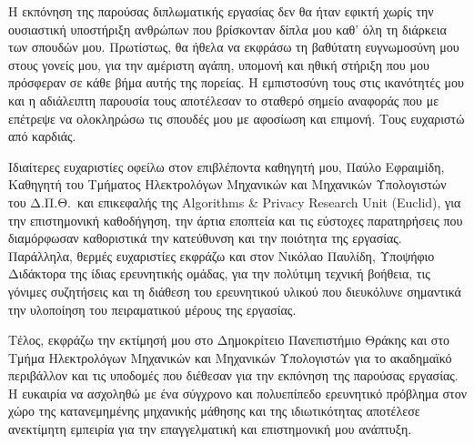 
Η εκπόνηση της παρούσας διπλωματικής εργασίας δεν θα ήταν εφικτή χωρίς την ουσιαστική υποστήριξη ανθρώπων που βρίσκονταν δίπλα μου καθ' όλη τη διάρκεια των σπουδών μου. Πρωτίστως, θα ήθελα να εκφράσω τη βαθύτατη ευγνωμοσύνη μου στους γονείς μου, για την αμέριστη αγάπη, υπομονή και ηθική στήριξη που μου πρόσφεραν σε κάθε βήμα αυτής της πορείας. Η εμπιστοσύνη τους στις ικανότητές μου και η αδιάλειπτη παρουσία τους αποτέλεσαν το σταθερό σημείο αναφοράς που με επέτρεψε να ολοκληρώσω τις σπουδές μου με αφοσίωση και επιμονή. Τους ευχαριστώ από καρδιάς.

Ιδιαίτερες ευχαριστίες οφείλω στον επιβλέποντα καθηγητή μου, Παύλο Εφραιμίδη, Καθηγητή του Τμήματος Ηλεκτρολόγων Μηχανικών και Μηχανικών Υπολογιστών του Δ.Π.Θ.\ και επικεφαλής της Algorithms \& Privacy Research Unit (Euclid), για την επιστημονική καθοδήγηση, την άρτια εποπτεία και τις εύστοχες παρατηρήσεις που διαμόρφωσαν καθοριστικά την κατεύθυνση και την ποιότητα της εργασίας. Παράλληλα, θερμές ευχαριστίες εκφράζω και στον Νικόλαο Παυλίδη, Υποψήφιο Διδάκτορα της ίδιας ερευνητικής ομάδας, για την πολύτιμη τεχνική βοήθεια, τις γόνιμες συζητήσεις και τη διάθεση του ερευνητικού υλικού που διευκόλυνε σημαντικά την υλοποίηση του πειραματικού μέρους της εργασίας.

Τέλος, εκφράζω την εκτίμησή μου στο Δημοκρίτειο Πανεπιστήμιο Θράκης και στο Τμήμα Ηλεκτρολόγων Μηχανικών και Μηχανικών Υπολογιστών για το ακαδημαϊκό περιβάλλον και τις υποδομές που διέθεσαν για την εκπόνηση της παρούσας εργασίας. Η ευκαιρία να ασχοληθώ με ένα σύγχρονο και πολυεπίπεδο ερευνητικό πρόβλημα στον χώρο της κατανεμημένης μηχανικής μάθησης και της ιδιωτικότητας αποτέλεσε ανεκτίμητη εμπειρία για την επαγγελματική και επιστημονική μου ανάπτυξη.
